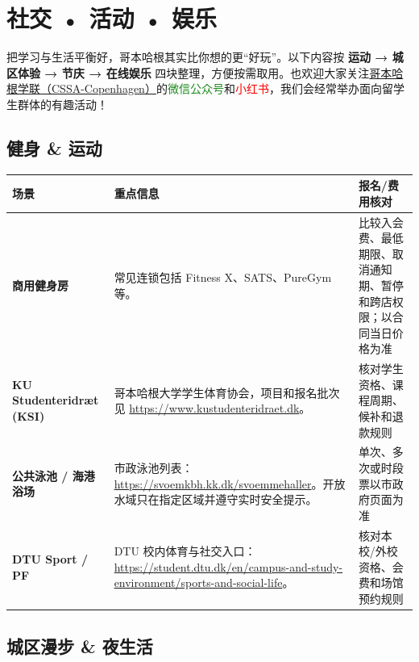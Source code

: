 \section{社交 • 活动 • 娱乐}\label{sec:social}

把学习与生活平衡好，哥本哈根其实比你想的更“好玩”。以下内容按 \textbf{运动 → 城区体验 → 节庆 → 在线娱乐} 四块整理，方便按需取用。也欢迎大家关注\hyperref[sec:docintro]{哥本哈根学联（CSSA-Copenhagen）}的\textcolor{ForestGreen}{微信公众号}和\textcolor{red}{小红书}，我们会经常举办面向留学生群体的有趣活动！

\subsection{健身 \& 运动}

\begin{table}[H]
  \scriptsize
  \centering
  \renewcommand{\arraystretch}{1.2}
  \setlength{\tabcolsep}{5pt}
  \label{tab:fitness}
  \begin{tabularx}{\textwidth}{p{} X p{}}
    \toprule
    \textbf{场景} & \textbf{重点信息} & \textbf{报名/费用核对} \\
    \midrule
    \textbf{商用健身房} & 常见连锁包括 Fitness X、SATS、PureGym 等。 & 比较入会费、最低期限、取消通知期、暂停和跨店权限；以合同当日价格为准 \\
    \textbf{KU Studenteridræt (KSI)} & 哥本哈根大学学生体育协会，项目和报名批次见 \url{https://www.kustudenteridraet.dk}。 & 核对学生资格、课程周期、候补和退款规则 \\
    \textbf{公共泳池 / 海港浴场} & 市政泳池列表：\url{https://svoemkbh.kk.dk/svoemmehaller}。开放水域只在指定区域并遵守实时安全提示。 & 单次、多次或时段票以市政府页面为准 \\
    \textbf{DTU Sport / PF} & DTU 校内体育与社交入口：\url{https://student.dtu.dk/en/campus-and-study-environment/sports-and-social-life}。 & 核对本校/外校资格、会费和场馆预约规则 \\
    \bottomrule
  \end{tabularx}
\end{table}


\subsection{城区漫步 \& 夜生活}

